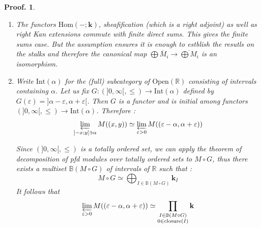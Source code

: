 \documentclass[a4paper, english, 11pt]{article}
\newcommand{\kk}[0]{\textbf{k}}
\newcommand{\0}{\vec{0}}
\newcommand{\R}[0]{\mathbb{R}}
\newcommand{\Ouv}[0]{\mathrm{Open}}
\newcommand{\Hom}[0]{\text{Hom}}
\newtheorem*{pf}{Proof.} }
\begin{document}
\begin{pf}
\begin{enumerate}
This proves the adjunction formula. The fact that the counit is given by~\eqref{eq:unitadjPetoSh} is 
a direct consequence of  the proof of property (1).
    \item The functors $\Hom(-;\kk)$, sheafification (which is a right adjoint) as well as right Kan extensions  commute with finite direct sums. This gives the finite sums case. But the assumption ensures it is enough to estblish the resutls on the stalks and therefore the canonical map $\bigoplus \overline{M}_i \to \overline{\bigoplus M_i}$ is an isomorphism.
    \item Write $\text{Int}(\alpha)$ for the (full) subcategory of $\Ouv(\R)$ consisting of intervals containing $\alpha$. Let us fix  $G :  (]0,\infty[,\leq)  \longrightarrow \text{Int}(\alpha)$ defined by 
  $G(\varepsilon) = ]\alpha - \varepsilon , \alpha + \varepsilon[  $. Then $G$ is a functor and is initial among functors $ (]0,\infty[,\leq)  \longrightarrow \text{Int}(\alpha)$. Therefore : 
     $$ \varprojlim_{]-x;y[\ni \alpha}M((x,y)) \simeq \varprojlim_{\varepsilon > 0}M((\varepsilon - \alpha  , \alpha + \varepsilon)) $$
     
     
     Since $(]0,\infty[,\leq) $ is a totally ordered set, we can apply the theorem of decomposition of pfd modules over totally ordered sets to $M\circ G$, thus there exists a multiset $\mathbb{B}(M\circ G)$ of intervals of $\R$ such that : 
     \begin{equation}\label{eq:DefMoG} M\circ G \simeq \bigoplus_{I\in \mathbb{B}(M\circ G)} \kk_I \end{equation}
    It follows that \begin{equation}\label{eq:porjlimM} \varprojlim_{\varepsilon > 0}M((\varepsilon - \alpha  , \alpha + \varepsilon)) \simeq \prod_{\substack{I\in \mathbb{B}(M\circ G)\\ 0 \in \text{closure}(I)}} \kk  \end{equation}
                                                                                                                                                                                                                  

\end{enumerate}
\end{pf}
\end{document}
